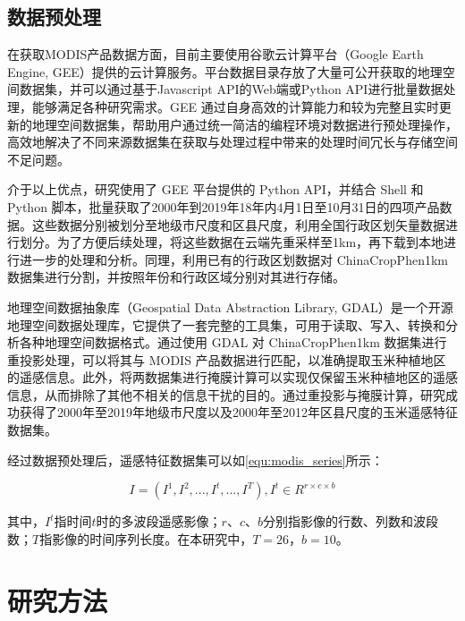 \subsection{数据预处理}
\par 在获取MODIS产品数据方面，目前主要使用谷歌云计算平台（Google Earth Engine, GEE）提供的云计算服务\cite{gorelick2017google}。平台数据目录存放了大量可公开获取的地理空间数据集，并可以通过基于Javascript API的Web端或Python API进行批量数据处理，能够满足各种研究需求。GEE 通过自身高效的计算能力和较为完整且实时更新的地理空间数据集，帮助用户通过统一简洁的编程环境对数据进行预处理操作，高效地解决了不同来源数据集在获取与处理过程中带来的处理时间冗长与存储空间不足问题。

\par 介于以上优点，研究使用了 GEE 平台提供的 Python API，并结合 Shell 和 Python 脚本，批量获取了2000年到2019年18年内4月1日至10月31日的四项产品数据。这些数据分别被划分至地级市尺度和区县尺度，利用全国行政区划矢量数据进行划分。为了方便后续处理，将这些数据在云端先重采样至1km，再下载到本地进行进一步的处理和分析。同理，利用已有的行政区划数据对 ChinaCropPhen1km 数据集进行分割，并按照年份和行政区域分别对其进行存储。

\par 地理空间数据抽象库\cite{warmerdam2008geospatial}（Geospatial Data Abstraction Library, GDAL）是一个开源地理空间数据处理库，它提供了一套完整的工具集，可用于读取、写入、转换和分析各种地理空间数据格式。通过使用 GDAL 对 ChinaCropPhen1km 数据集进行重投影处理，可以将其与 MODIS 产品数据进行匹配，以准确提取玉米种植地区的遥感信息。此外，将两数据集进行掩膜计算可以实现仅保留玉米种植地区的遥感信息，从而排除了其他不相关的信息干扰的目的。通过重投影与掩膜计算，研究成功获得了2000年至2019年地级市尺度以及2000年至2012年区县尺度的玉米遥感特征数据集。

\par 经过数据预处理后，遥感特征数据集可以如\autoref{equ:modis_series}所示：

\begin{equation}
    \label{equ:modis_series}
    I=(I^1, I^2, ..., I^t, ..., I^T), I^t\in R^{r\times c\times b}
\end{equation}
\par 其中，$I^t$指时间$t$时的多波段遥感影像；$r$、$c$、$b$分别指影像的行数、列数和波段数；$T$指影像的时间序列长度。在本研究中，$T=26$，$b=10$。

\section{研究方法}
